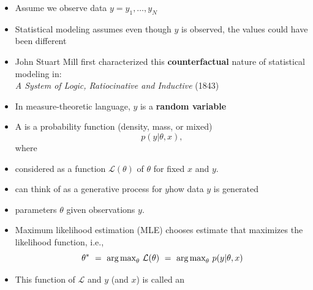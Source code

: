 \documentclass[10pt]{report}
\begin{document}

\begin{itemize}
\item Assume we observe data $y = y_1, \ldots, y_N$
\item Statistical modeling assumes even though $y$ is observed,
the values could have been different
\item John Stuart Mill first characterized this {\bfseries counterfactual} nature of statistical modeling in:
\\[3pt] {\slshape A System of Logic, Ratiocinative and Inductive} (1843)
\item In measure-theoretic language, $y$ is a {\bfseries random variable}
\end{itemize}

%
\begin{itemize}
\item A  is a probability function (density, mass, or mixed) 
\[
p(y|\theta,x),
\]
where
\item considered as a function $\mathcal{L}(\theta)$ of $\theta$ for fixed $x$ and $y$.
\item can think of as a generative process for $y$how data $y$ is generated
\end{itemize}

\begin{itemize}
\item {} parameters $\theta$ given observations $y$.
\item Maximum likelihood estimation (MLE) chooses 
estimate that maximizes the likelihood function, i.e.,
\[
\theta^* 
\ = \ \mbox{arg\,max}_{\theta} \ \mathcal{L}(\theta) 
\ = \ \mbox{arg\,max}_{\theta} \ p(y|\theta,x)
\]
\item This function of $\mathcal{L}$ and $y$ (and $x$) is called an 
\end{itemize}
\end{document}
